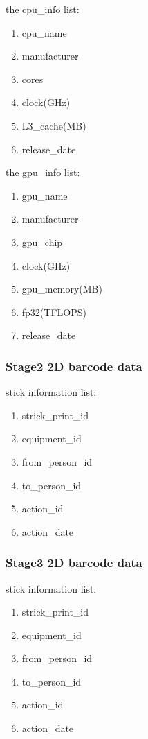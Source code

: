 \documentclass[a4paper,11pt]{article}
\begin{document}
the cpu\_info list:
\begin{enumerate}
	\item cpu\_name
	\item manufacturer
	\item cores
	\item clock(GHz)
	\item L3\_cache(MB)
	\item release\_date
\end{enumerate}

the gpu\_info list:
\begin{enumerate}
	\item gpu\_name
	\item manufacturer
	\item gpu\_chip
	\item clock(GHz)
	\item gpu\_memory(MB)
	\item fp32(TFLOPS)
	\item release\_date
\end{enumerate}

\subsubsection {Stage2 2D barcode data}
stick information list:
\begin{enumerate}
	\item strick\_print\_id
	\item equipment\_id
	\item from\_person\_id
	\item to\_person\_id
	\item action\_id
	\item action\_date
\end{enumerate}

\subsubsection {Stage3 2D barcode data}
stick information list:
\begin{enumerate}
	\item strick\_print\_id
	\item equipment\_id
	\item from\_person\_id
	\item to\_person\_id
	\item action\_id
	\item action\_date
\end{enumerate}
\end{document}
